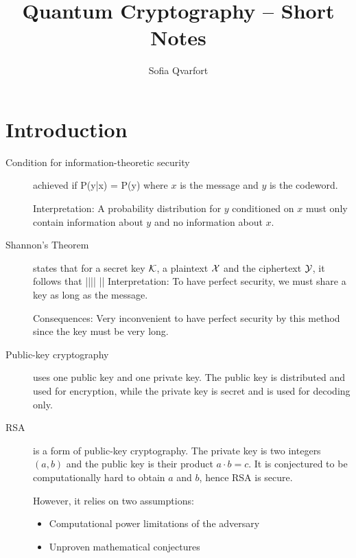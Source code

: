 


\title{Quantum Cryptography -- Short Notes}
\author{Sofia Qvarfort}
\maketitle
\tableofcontents
\section{Introduction}
\begin{description}
\item[Condition for information-theoretic security] achieved if
\beq
P(y|x) = P(y)
\eeq
where $x$ is the message and $y$ is the codeword. 

Interpretation: A probability distribution for $y$ conditioned on $x$ must only contain information about $y$ and no information about $x$. 

\item[Shannon's Theorem] states that for a secret key $\cal{K}$, a plaintext $\cal{X}$ and the ciphertext $\cal{Y}$, it follows that
\beq
||\geq  || \geq ||
\eeq
Interpretation: To have perfect security, we must share a key as long as the message. 

Consequences: Very inconvenient to have perfect security by this method since the key must be very long. 

\item[Public-key cryptography] uses one public key and one private key. The public key is distributed and used for encryption, while the private key is secret and is used for decoding only. 

\item[RSA] is a form of public-key cryptography. The private key is two integers $(a,b)$ and the public key is their product $a\cdot b = c$. It is conjectured to be computationally hard to obtain $a$ and $b$, hence RSA is secure. 

However, it relies on two assumptions:
\begin{itemize}
\item Computational power limitations of the adversary
\item Unproven mathematical conjectures
\end{itemize}

\end{description}
